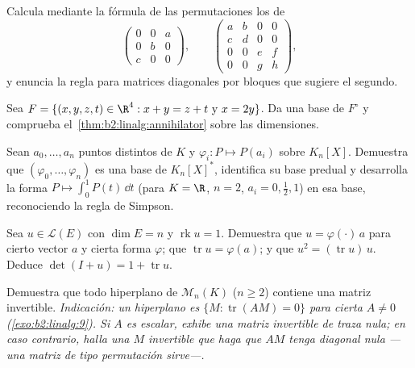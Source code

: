 \begin{exercise}[$\star$]\label{exo:b2:linalg:2}
Calcula mediante la fórmula de las permutaciones los
 de
\[
\begin{pmatrix} 0 & 0 & a\\ 0 & b & 0\\ c & 0 & 0 \end{pmatrix},
\qquad
\begin{pmatrix}
a & b & 0 & 0\\
c & d & 0 & 0\\
0 & 0 & e & f\\
0 & 0 & g & h
\end{pmatrix},
\]
y enuncia la regla para matrices diagonales por bloques que sugiere
el segundo.
\end{exercise}

\begin{exercise}[$\star$]\label{exo:b2:linalg:3}
Sea $F = \{(x,y,z,t) \in \R^4 : x + y = z + t \text{ y } x = 2y\}$.
Da una base de $F^\circ$ y comprueba el~\cref{thm:b2:linalg:annihilator} sobre las dimensiones.
\end{exercise}

\begin{exercise}[$\star\star$]\label{exo:b2:linalg:4}
Sean $a_0, \dots, a_n$ puntos distintos de $K$ y $\varphi_i \colon P
\mapsto P(a_i)$ sobre $K_n[X]$. Demuestra que $(\varphi_0, \dots,
\varphi_n)$ es una base de $K_n[X]^*$, identifica su base
predual y desarrolla la forma $P \mapsto \int_0^1 P(t)\,\dd t$
(para $K = \R$, $n = 2$, $a_i = 0, \frac12, 1$) en esa base,
reconociendo la regla de Simpson.
\end{exercise}

\begin{exercise}[$\star\star$]\label{exo:b2:linalg:5}
Sea $u \in \mathcal{L}(E)$ con $\dim E = n$ y $\operatorname{rk} u =
1$. Demuestra que $u = \varphi(\cdot)\, a$ para cierto vector $a$ y
cierta forma $\varphi$; que $\operatorname{tr} u = \varphi(a)$; y que
$u^2 = (\operatorname{tr} u)\, u$. Deduce $\det(I + u) = 1 +
\operatorname{tr} u$.
\end{exercise}

\begin{exercise}[$\star\star$]\label{exo:b2:linalg:6}
Demuestra que todo hiperplano de $\mathcal{M}_n(K)$ ($n \geq 2$)
contiene una matriz invertible. \emph{Indicación: un hiperplano es
$\{M : \operatorname{tr}(AM) = 0\}$ para cierta $A \neq 0$
(\cref{exo:b2:linalg:9}). Si $A$ es escalar, exhibe una matriz
invertible de traza nula; en caso contrario, halla una $M$ invertible
que haga que $AM$ tenga diagonal nula ---una matriz de tipo
permutación sirve---.}
\end{exercise}

